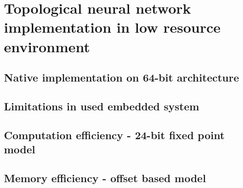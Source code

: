 \section{Topological neural network implementation in low resource environment}

\FloatBarrier
\subsection{Native implementation on 64-bit architecture}

\FloatBarrier
\subsection{Limitations in used embedded system}

\FloatBarrier
\subsection{Computation efficiency - 24-bit fixed point model}

\FloatBarrier
\subsection{Memory efficiency - offset based model}
